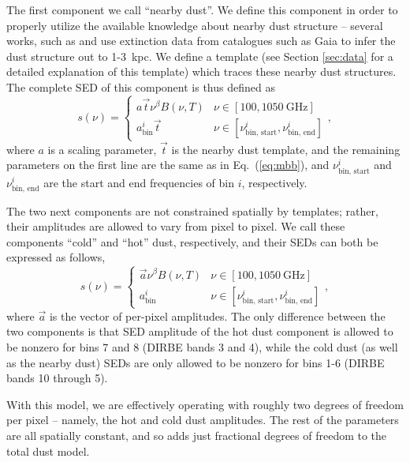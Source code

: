\documentclass{aa}
\renewcommand{\a}[0]{\vec{a}}
\renewcommand{\t}[0]{\vec{t}}
\begin{document}
The first component we call ``nearby dust''. We define this component in order
to properly utilize the available knowledge about nearby dust structure --
several works, such as \citet{Dharmawardena:2024} and \citet{edenhofer:2024}
use extinction data from catalogues such as Gaia to infer the dust structure
out to 1-3~kpc. We define a template (see Section \ref{sec:data} for a detailed
explanation of this template) which traces these nearby dust structures. The
complete SED of this component is thus defined as
\begin{equation}
    \label{eq:nearby_dust}
    s(\nu) = \begin{cases} a\t\nu^{\beta} B(\nu, T) & \nu \in [100,
        1050~\text{GHz}] \\
        a^i_{\textrm{bin}}\t & \nu \in [\nu_{\textrm{bin, start}}^i,
        \nu_{\textrm{bin, end}}^i]
            \end{cases},
\end{equation}
where $a$ is a scaling parameter, $\t$ is the nearby dust template, and the
remaining parameters on the first line are the same as in Eq.~(\ref{eq:mbb}),
and $\nu_{\textrm{bin, start}}^i$ and $\nu_{\textrm{bin, end}}^i$ are the start
and end frequencies of bin $i$, respectively.

The two next components are not constrained spatially by templates; rather,
their amplitudes are allowed to vary from pixel to pixel. We call these
components ``cold'' and ``hot'' dust, respectively, and their SEDs can both be
expressed as follows,
\begin{equation}
    \label{eq:coldhotdust}
    s(\nu) = \begin{cases} \a\nu^{\beta} B(\nu, T) & \nu \in [100,
        1050~\text{GHz}] \\
        a^i_{\textrm{bin}} & \nu \in [\nu_{\textrm{bin, start}}^i,
        \nu_{\textrm{bin, end}}^i]
            \end{cases},
\end{equation}
where $\a$ is the vector of per-pixel amplitudes. The only difference between
the two components is that SED amplitude of the hot dust component is allowed
to be nonzero for bins 7 and 8 (DIRBE bands 3 and 4), while the cold dust
(as well as the nearby dust) SEDs are only allowed to be nonzero for bins 1-6
(DIRBE bands 10 through 5).

With this model, we are effectively operating with roughly two degrees of
freedom per pixel -- namely, the hot and cold dust amplitudes. The rest of the
parameters are all spatially constant, and so adds just fractional degrees of
freedom to the total dust model.
\end{document}
